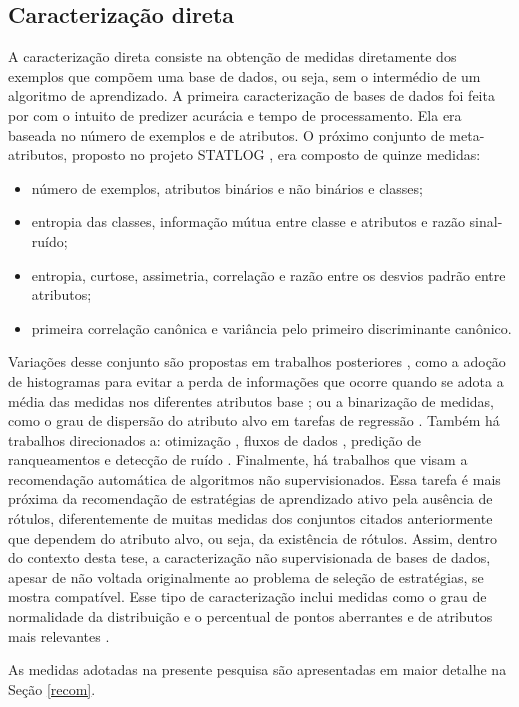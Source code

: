 \subsection{Caracterização direta}\label{direta}
A caracterização direta consiste na obtenção de medidas diretamente dos exemplos
que compõem uma base de dados, ou seja, sem o intermédio de um algoritmo
de aprendizado.
A primeira caracterização de bases de dados foi feita por \cite{conf/ijcai/RendellST87}
com o intuito de predizer acurácia e tempo de processamento.
Ela era baseada no número de exemplos e de atributos.
O próximo conjunto de meta-atributos, proposto no projeto STATLOG
\citep{brazdil1994analysis}, era composto de quinze medidas:
\begin{itemize}
 \item número de exemplos, atributos binários e não binários e classes;
 \item entropia das classes, informação mútua entre classe e atributos e razão sinal-ruído;
 \item entropia, curtose, assimetria, correlação e razão entre os desvios padrão entre atributos;
 \item primeira correlação canônica e variância pelo primeiro discriminante canônico.
\end{itemize}
Variações desse conjunto são propostas em trabalhos posteriores
\citep{books/daglib/0022052},
como a adoção de histogramas para evitar a perda de informações que ocorre quando
se adota a média das medidas nos diferentes atributos base \citep{kalousis2002algorithm};
ou a binarização de medidas, como o grau de dispersão do atributo alvo em
tarefas de regressão \citep{journals/ijon/GomesPSRC12}.
Também há trabalhos direcionados a: otimização \citep{journals/ijhis/KandaCHS11},
fluxos de dados \citep{journals/ijon/RossiCSS14}, predição de ranqueamentos
\citep{conf/iberamia/SouzaCS10} e detecção de ruído \citep{Garcia2015}.
Finalmente, há trabalhos que visam a recomendação automática de algoritmos
não supervisionados.
Essa tarefa é mais próxima da recomendação de estratégias de aprendizado ativo
pela ausência de rótulos, diferentemente de muitas medidas dos conjuntos
citados anteriormente que dependem do atributo alvo, ou seja,
da existência de rótulos.
Assim, dentro do contexto desta tese, a caracterização não supervisionada
de bases de dados, apesar de não voltada originalmente ao problema
de seleção de estratégias, se mostra compatível.
Esse tipo de caracterização inclui medidas como o grau de normalidade da distribuição e
o percentual de pontos aberrantes e de atributos mais relevantes
\citep{conf/ijcnn/SoutoPSACLS08,Ferrari2015181}.


As medidas adotadas na presente pesquisa são apresentadas em maior detalhe na
Seção \ref{recom}.

